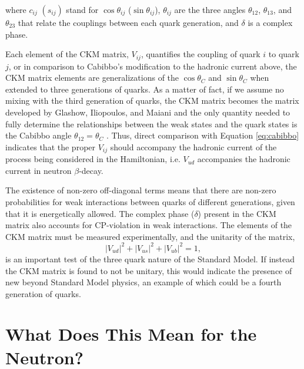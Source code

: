 \noindent where $c_{ij}$ $(s_{ij})$ stand for $\cos\theta_{ij}$ ($\sin\theta_{ij}$), $\theta_{ij}$
are the three angles $\theta_{12}$, $\theta_{13}$, and $\theta_{23}$ that relate the couplings
between each quark generation, and $\delta$ is a
complex phase.

Each element of the CKM matrix, $V_{ij}$, quantifies the coupling of quark $i$
to quark $j$, or in comparison to Cabibbo's modification to the hadronic current
above, the CKM matrix elements are generalizations of the $\cos\theta_C$ and $\sin\theta_C$
when extended to three generations of quarks. As a matter of fact, if we assume no mixing
with the third generation of quarks, the CKM matrix becomes the matrix developed by
Glashow, Iliopoulos, and Maiani and the only quantity needed to fully determine
the relationships between the weak states and the quark states is the Cabibbo angle $\theta_{12}=\theta_C$
\cite{griffiths2008}.
Thus, direct comparison with Equation \ref{eq:cabibbo} indicates that the proper
$V_{ij}$ should accompany the hadronic current
of the process being considered in the Hamiltonian, i.e. $V_{ud}$ accompanies the hadronic
current in neutron $\beta$-decay.

The existence of non-zero off-diagonal terms means that there are non-zero probabilities for
weak interactions between quarks of different generations, given that it is energetically
allowed. The complex phase ($\delta$) present in the CKM
matrix also accounts for CP-violation in weak interactions.
The elements of the CKM matrix must be measured experimentally, and the unitarity of the matrix,
%
\begin{equation}
  |V_{ud}|^2 + |V_{us}|^2 + |V_{ub}|^2 = 1,
\end{equation}
is an important test of the three quark nature of the Standard Model. If
instead the CKM matrix is found to not be unitary, this would indicate the presence of
new beyond Standard Model physics, an example of which could be a fourth generation of quarks.


\section{What Does This Mean for the Neutron?}

